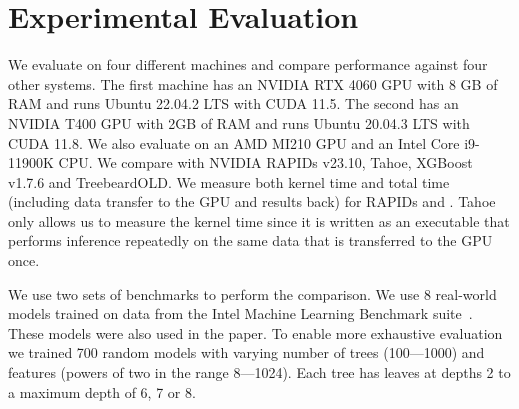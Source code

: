 \section{Experimental Evaluation}
\label{sec:results}

We evaluate \Treebeard{} on four different machines and compare performance against four other systems. The first machine 
has an NVIDIA RTX 4060 GPU with 8 GB of RAM and runs Ubuntu 22.04.2 LTS with CUDA 11.5. The 
second has 
an NVIDIA T400 GPU with 2GB of RAM and runs Ubuntu 20.04.3 LTS with CUDA 11.8. We also evaluate \Treebeard{} on 
an AMD MI210 GPU and an Intel Core i9-11900K CPU. 
We compare \Treebeard{} with NVIDIA RAPIDs v23.10,
Tahoe, XGBoost v1.7.6 and TreebeardOLD{}. We measure both kernel time and total time (including data transfer to the GPU and results back) for RAPIDs and \Treebeard{}.
Tahoe only allows us to measure the kernel time since it is written as an executable that performs inference repeatedly on the same data that is transferred to the GPU once.

We use two sets of benchmarks to perform the comparison.
We use 8 real-world models trained on data from the Intel Machine Learning Benchmark suite~\cite{}. These models were also used in the \TreebeardOLD{} paper\cite{Treebeard}.
To enable more exhaustive evaluation we trained 700 random models with varying number of trees (100---1000) and features (powers of two in the range 8---1024). Each tree has leaves at depths 2 to a maximum depth of 6, 7 or 8.


